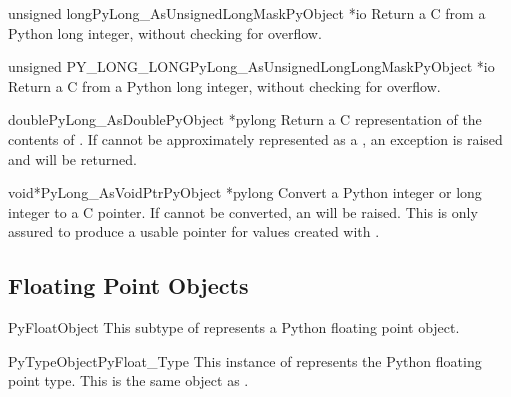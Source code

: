 \begin{cfuncdesc}{unsigned long}{PyLong_AsUnsignedLongMask}{PyObject *io}
  Return a C  from a Python long integer, without
  checking for overflow.
\end{cfuncdesc}

\begin{cfuncdesc}{unsigned PY_LONG_LONG}{PyLong_AsUnsignedLongLongMask}{PyObject *io}
  Return a C  from a Python long integer, without
  checking for overflow.
\end{cfuncdesc}

\begin{cfuncdesc}{double}{PyLong_AsDouble}{PyObject *pylong}
  Return a C  representation of the contents of
  .  If  cannot be approximately represented
  as a , an  exception is
  raised and  will be returned.
\end{cfuncdesc}

\begin{cfuncdesc}{void*}{PyLong_AsVoidPtr}{PyObject *pylong}
  Convert a Python integer or long integer  to a C
   pointer.  If  cannot be converted, an
   will be raised.  This is only assured to
  produce a usable  pointer for values created with
  .
\end{cfuncdesc}


\subsection{Floating Point Objects \label{floatObjects}}

\begin{ctypedesc}{PyFloatObject}
  This subtype of  represents a Python floating point
  object.
\end{ctypedesc}

\begin{cvardesc}{PyTypeObject}{PyFloat_Type}
  This instance of  represents the Python floating
  point type.  This is the same object as .
\end{cvardesc}

